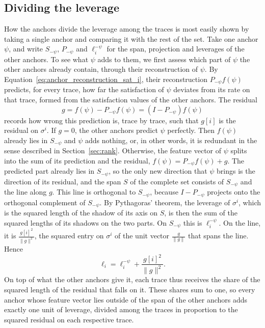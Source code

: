 \documentclass[titlepage,a4paper,11pt]{report}
\begin{document}
    \subsection{Dividing the leverage}\label{sec:dividing_the_leverage}
    How the anchors divide the leverage among the traces is most easily shown by taking a single anchor and comparing it with the rest of the set. Take one anchor $\psi$, and write $S_{-\psi}$, $P_{-\psi}$ and $\ell_i^{-\psi}$ for the span, projection and leverages of the other anchors. To see what $\psi$ adds to them, we first assess which part of $\psi$ the other anchors already contain, through their reconstruction of $\psi$. By Equation~\eqref{eq:anchor_reconstruction_sat_i}, their reconstruction $P_{-\psi}f(\psi)$ predicts, for every trace, how far the satisfaction of $\psi$ deviates from its rate on that trace, formed from the satisfaction values of the other anchors. The residual
    \begin{equation}\label{eq:anchor_residual}
        g=f(\psi)-P_{-\psi}f(\psi)=(I-P_{-\psi})f(\psi)
    \end{equation}
    records how wrong this prediction is, trace by trace, such that $g[i]$ is the residual on $\sigma^i$. If $g=0$, the other anchors predict $\psi$ perfectly. Then $f(\psi)$ already lies in $S_{-\psi}$ and $\psi$ adds nothing, or, in other words, it is redundant in the sense described in Section~\ref{sec:rank}. Otherwise, the feature vector of $\psi$ splits into the sum of its prediction and the residual, $f(\psi)=P_{-\psi}f(\psi)+g$. The predicted part already lies in $S_{-\psi}$, so the only new direction that $\psi$ brings is the direction of its residual, and the span $S$ of the complete set consists of $S_{-\psi}$ and the line along $g$. This line is orthogonal to $S_{-\psi}$, because $I-P_{-\psi}$ projects onto the orthogonal complement of $S_{-\psi}$. By Pythagoras' theorem, the leverage of $\sigma^i$, which is the squared length of the shadow of its axis on $S$, is then the sum of the squared lengths of its shadows on the two parts. On $S_{-\psi}$ this is $\ell_i^{-\psi}$. On the line, it is $\frac{g[i]^2}{\lVert g\rVert^2}$, the squared entry on $\sigma^i$ of the unit vector $\frac{g}{\lVert g\rVert}$ that spans the line. Hence
    \begin{equation}\label{eq:leverage_update}
        \ell_i=\ell_i^{-\psi}+\frac{g[i]^2}{\lVert g\rVert^2}.
    \end{equation}
    On top of what the other anchors give it, each trace thus receives the share of the squared length of the residual that falls on it. These shares sum to one, so every anchor whose feature vector lies outside of the span of the other anchors adds exactly one unit of leverage, divided among the traces in proportion to the squared residual on each respective trace.
\end{document}
